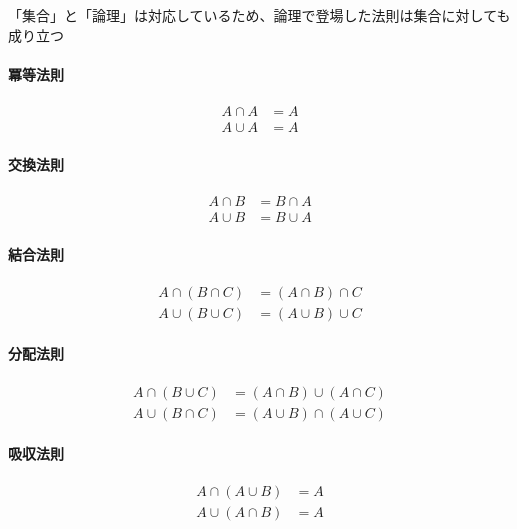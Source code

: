 \documentclass[../book_ronri-and-set]{subfiles}
\begin{document}
「集合」と「論理」は対応しているため、論理で登場した法則は集合に対しても成り立つ

\begin{oframed}
  \paragraph{冪等法則}
  \begin{align*}
    A \cap A & = A \\
    A \cup A & = A
  \end{align*}
\end{oframed}

\begin{oframed}
  \paragraph{交換法則}
  \begin{align*}
    A \cap B & = B \cap A \\
    A \cup B & = B \cup A
  \end{align*}
\end{oframed}

\begin{oframed}
  \paragraph{結合法則}
  \begin{align*}
    A \cap (B \cap C) & = (A \cap B) \cap C \\
    A \cup (B \cup C) & = (A \cup B) \cup C
  \end{align*}
\end{oframed}

\begin{oframed}
  \paragraph{分配法則}
  \begin{align*}
    A \cap (B \cup C) & = (A \cap B) \cup (A \cap C) \\
    A \cup (B \cap C) & = (A \cup B) \cap (A \cup C)
  \end{align*}
\end{oframed}

\begin{oframed}
  \paragraph{吸収法則}
  \begin{align*}
    A \cap (A \cup B) & = A \\
    A \cup (A \cap B) & = A
  \end{align*}
\end{oframed}
\end{document}
